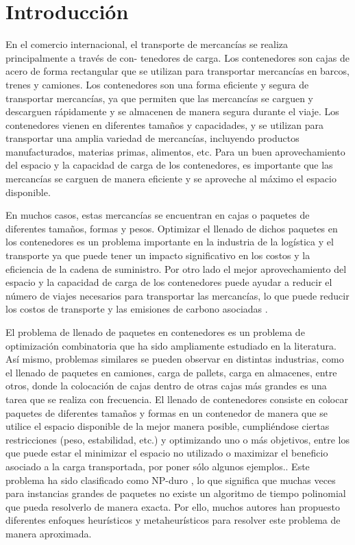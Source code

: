 \section{Introducción} \label{sec: introducción}

En el comercio internacional, el transporte de mercancías se realiza principalmente a través de con- tenedores de carga. Los contenedores son cajas de acero de forma rectangular que se utilizan para transportar mercancías en barcos, trenes y camiones. Los contenedores son una forma eficiente y segura de transportar mercancías, ya que permiten que las mercancías se carguen y descarguen rápidamente y se almacenen de manera segura durante el viaje. Los contenedores vienen en diferentes tamaños y capacidades, y se utilizan para transportar una amplia variedad de mercancías, incluyendo productos manufacturados, materias primas, alimentos, etc. Para un buen aprovechamiento del espacio y la capacidad de carga de los contenedores, es importante que las mercancías se carguen de manera eficiente y se aproveche al máximo el espacio disponible.

En muchos casos, estas mercancías se encuentran en cajas o paquetes de diferentes tamaños, formas y pesos. Optimizar el llenado de dichos paquetes en los contenedores es un problema importante en la industria de la logística y el transporte ya que puede tener un impacto significativo en los costos y la eficiencia de la cadena de suministro. Por otro lado el mejor aprovechamiento del espacio y la capacidad de carga de los contenedores puede ayudar a reducir el número de viajes necesarios para transportar las mercancías, lo que puede reducir los costos de transporte y las emisiones de carbono asociadas \parencite{Parreo2008AMA}.

El problema de llenado de paquetes en contenedores es un problema de optimización combinatoria que ha sido ampliamente estudiado en la literatura. Así mismo, problemas similares se pueden observar en distintas industrias, como el llenado de paquetes en camiones, carga de pallets, carga en almacenes, entre otros, donde la colocación de cajas dentro de otras cajas más grandes es una tarea que se realiza con frecuencia. El llenado de contenedores consiste en colocar paquetes de diferentes tamaños y formas en un contenedor de manera que se utilice el espacio disponible de la mejor manera posible, cumpliéndose ciertas restricciones (peso, estabilidad, etc.) y optimizando uno o más objetivos, entre los que puede estar el minimizar el espacio no utilizado o maximizar el beneficio asociado a la carga transportada, por poner sólo algunos ejemplos.. Este problema ha sido clasificado como NP-duro \parencite{PISINGER2002382}, lo que significa que muchas veces para instancias grandes de paquetes no existe un algoritmo de tiempo polinomial que pueda resolverlo de manera exacta. Por ello, muchos autores han propuesto diferentes enfoques heurísticos y metaheurísticos para resolver este problema de manera aproximada.

